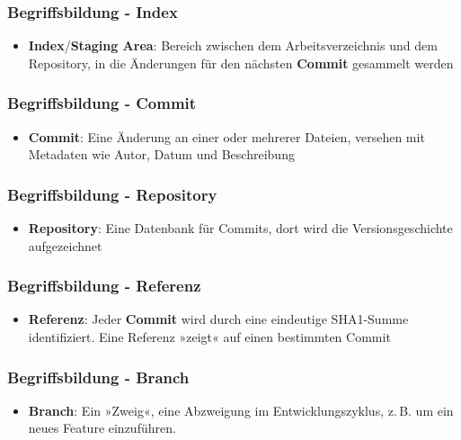 \documentclass{beamer}
\begin{document}
\begin{frame}
 \frametitle{Begriffsbildung - Index}



\begin{itemize}
	\item \textbf{Index}/\textbf{Staging Area}: Bereich zwischen dem Arbeitsverzeichnis und dem Repository, in die Änderungen für den nächsten \textbf{Commit} gesammelt werden
\end{itemize}


 \end{frame}
\begin{frame}
 \frametitle{Begriffsbildung - Commit}



\begin{itemize}
	\item \textbf{Commit}: Eine Änderung an einer oder mehrerer Dateien, versehen mit Metadaten wie Autor, Datum und Beschreibung
\end{itemize}


 \end{frame}
\begin{frame}
 \frametitle{Begriffsbildung - Repository}



\begin{itemize}
	\item \textbf{Repository}: Eine Datenbank für Commits, dort wird die Versionsgeschichte aufgezeichnet
\end{itemize}


 \end{frame}
\begin{frame}
 \frametitle{Begriffsbildung - Referenz}



\begin{itemize}
	\item \textbf{Referenz}: Jeder \textbf{Commit} wird durch eine eindeutige SHA1-Summe identifiziert. Eine Referenz »zeigt« auf einen bestimmten Commit
\end{itemize}


 \end{frame}
\begin{frame}
 \frametitle{Begriffsbildung - Branch}



\begin{itemize}
	\item \textbf{Branch}: Ein »Zweig«, eine Abzweigung im Entwicklungszyklus, z.\,B. um ein neues Feature einzuführen.
\end{itemize}


 \end{frame}
\end{document}
